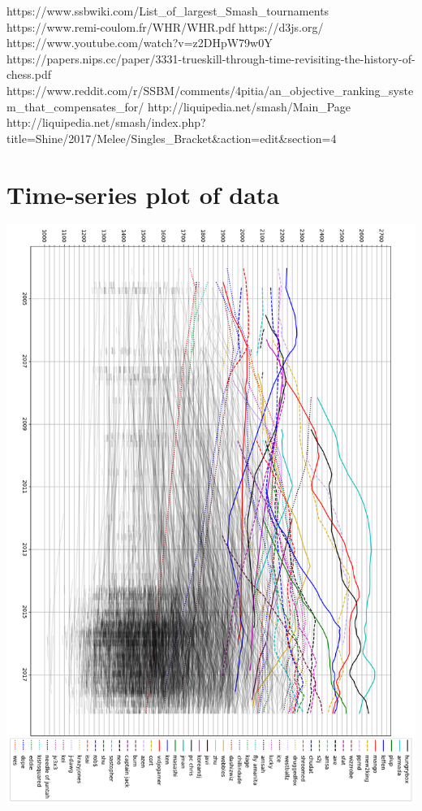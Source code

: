 \documentclass[10pt]{article}
\theoremstyle{definition}
\theoremstyle{remark}
\begin{document}
\newpage

\begin{thebibliography}{7}
 https://www.ssbwiki.com/List\_of\_largest\_Smash\_tournaments
 https://www.remi-coulom.fr/WHR/WHR.pdf 
 https://d3js.org/
 https://www.youtube.com/watch?v=z2DHpW79w0Y
 https://papers.nips.cc/paper/3331-trueskill-through-time-revisiting-the-history-of-chess.pdf
 https://www.reddit.com/r/SSBM/comments/4pitia/an\_objective\_ranking\_system\_that\_compensates\_for/
 http://liquipedia.net/smash/Main\_Page
 http://liquipedia.net/smash/index.php?title=Shine/2017/Melee/Singles\_Bracket\&action=edit\&section=4
\end{thebibliography}

\section{Time-series plot of data}

\begin{center}
\includegraphics[width=.9\linewidth]{../plot-rotated.png}
\end{center}
\end{document}
